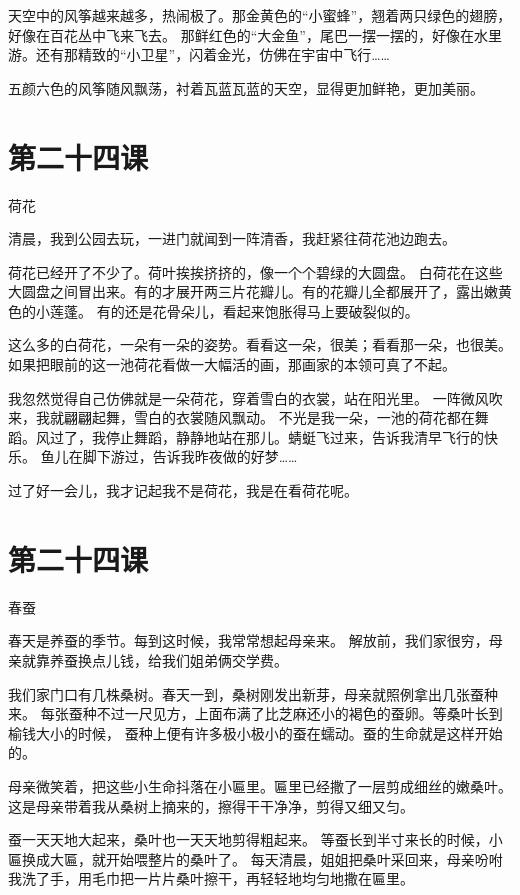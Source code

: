 \documentclass[12pt,UTF8]{ctexbook}
\begin{document}
天空中的风筝越来越多，热闹极了。那金黄色的“小蜜蜂”，翘着两只绿色的翅膀，好像在百花丛中飞来飞去。
那鲜红色的“大金鱼”，尾巴一摆一摆的，好像在水里游。还有那精致的“小卫星”，闪着金光，仿佛在宇宙中飞行……

五颜六色的风筝随风飘荡，衬着瓦蓝瓦蓝的天空，显得更加鲜艳，更加美丽。

\section{第二十四课}

荷花

清晨，我到公园去玩，一进门就闻到一阵清香，我赶紧往荷花池边跑去。

荷花已经开了不少了。荷叶挨挨挤挤的，像一个个碧绿的大圆盘。
白荷花在这些大圆盘之间冒出来。有的才展开两三片花瓣儿。有的花瓣儿全都展开了，露出嫩黄色的小莲蓬。
有的还是花骨朵儿，看起来饱胀得马上要破裂似的。

这么多的白荷花，一朵有一朵的姿势。看看这一朵，很美；看看那一朵，也很美。
如果把眼前的这一池荷花看做一大幅活的画，那画家的本领可真了不起。

我忽然觉得自己仿佛就是一朵荷花，穿着雪白的衣裳，站在阳光里。
一阵微风吹来，我就翩翩起舞，雪白的衣裳随风飘动。
不光是我一朵，一池的荷花都在舞蹈。风过了，我停止舞蹈，静静地站在那儿。蜻蜓飞过来，告诉我清早飞行的快乐。
鱼儿在脚下游过，告诉我昨夜做的好梦……

过了好一会儿，我才记起我不是荷花，我是在看荷花呢。

\section{第二十四课}

春蚕

春天是养蚕的季节。每到这时候，我常常想起母亲来。
解放前，我们家很穷，母亲就靠养蚕换点儿钱，给我们姐弟俩交学费。

我们家门口有几株桑树。春天一到，桑树刚发出新芽，母亲就照例拿出几张蚕种来。
每张蚕种不过一尺见方，上面布满了比芝麻还小的褐色的蚕卵。等桑叶长到榆钱大小的时候，
蚕种上便有许多极小极小的蚕在蠕动。蚕的生命就是这样开始的。

母亲微笑着，把这些小生命抖落在小匾里。匾里已经撒了一层剪成细丝的嫩桑叶。
这是母亲带着我从桑树上摘来的，擦得干干净净，剪得又细又匀。

蚕一天天地大起来，桑叶也一天天地剪得粗起来。
等蚕长到半寸来长的时候，小匾换成大匾，就开始喂整片的桑叶了。
每天清晨，姐姐把桑叶采回来，母亲吩咐我洗了手，用毛巾把一片片桑叶擦干，再轻轻地均匀地撒在匾里。
\end{document}
